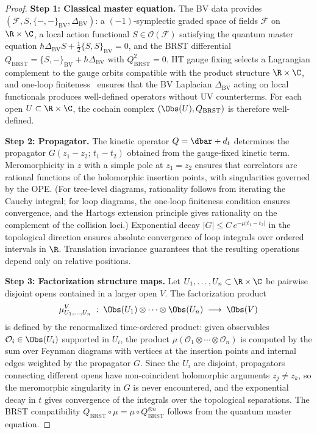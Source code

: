 \begin{proof}

\medskip\noindent\textbf{Step 1: Classical master equation.}
The BV data provides $({\mathcal F}, S, \{-,-\}_{\mathrm{BV}}, \Delta_{\mathrm{BV}})$: a $(-1)$-symplectic graded space of fields ${\mathcal F}$ on $\R\times\C$, a local action functional $S\in{\mathcal O}({\mathcal F})$ satisfying the quantum master equation $\hbar\Delta_{\mathrm{BV}}S + \tfrac{1}{2}\{S,S\}_{\mathrm{BV}}=0$, and the BRST differential $Q_{\mathrm{BRST}} = \{S,-\}_{\mathrm{BV}} + \hbar\Delta_{\mathrm{BV}}$ with $Q_{\mathrm{BRST}}^2=0$. HT gauge fixing selects a Lagrangian complement to the gauge orbits compatible with the product structure $\R\times\C$, and one-loop finiteness~\cite{GRW21} ensures that the BV Laplacian $\Delta_{\mathrm{BV}}$ acting on local functionals produces well-defined operators without UV counterterms. For each open $U\subset \R\times\C$, the cochain complex $(\Obs(U), Q_{\mathrm{BRST}})$ is therefore well-defined.

\medskip\noindent\textbf{Step 2: Propagator.}
The kinetic operator $Q = \dbar + d_t$ determines the propagator $G(z_1-z_2;\, t_1-t_2)$ obtained from the gauge-fixed kinetic term. Meromorphicity in $z$ with a simple pole at $z_1=z_2$ ensures that correlators are rational functions of the holomorphic insertion points, with singularities governed by the OPE. (For tree-level diagrams, rationality follows from iterating the Cauchy integral; for loop diagrams, the one-loop finiteness condition ensures convergence, and the Hartogs extension principle gives rationality on the complement of the collision loci.) Exponential decay $|G|\le C\,e^{-\mu|t_1-t_2|}$ in the topological direction ensures absolute convergence of loop integrals over ordered intervals in $\R$. Translation invariance guarantees that the resulting operations depend only on relative positions.

\medskip\noindent\textbf{Step 3: Factorization structure maps.}
Let $U_1,\ldots,U_n \subset \R\times\C$ be pairwise disjoint opens contained in a larger open $V$. The factorization product
\[
 \mu_{U_1,\ldots,U_n}^V \;:\;
 \Obs(U_1)\otimes \cdots \otimes \Obs(U_n)
 \;\longrightarrow\;
 \Obs(V)
\]
is defined by the renormalized time-ordered product: given observables ${\mathcal O}_i\in\Obs(U_i)$ supported in $U_i$, the product $\mu({\mathcal O}_1\otimes\cdots\otimes{\mathcal O}_n)$ is computed by the sum over Feynman diagrams with vertices at the insertion points and internal edges weighted by the propagator $G$. Since the $U_i$ are disjoint, propagators connecting different opens have non-coincident holomorphic arguments $z_j\ne z_k$, so the meromorphic singularity in $G$ is never encountered, and the exponential decay in $t$ gives convergence of the integrals over the topological separations. The BRST compatibility $Q_{\mathrm{BRST}}\circ\mu = \mu\circ Q_{\mathrm{BRST}}^{\otimes n}$ follows from the quantum master equation.


\end{proof}
